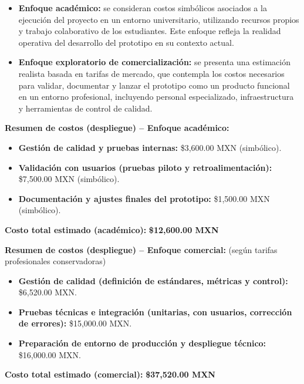 \begin{itemize}
	\item \textbf{Enfoque académico:} se consideran costos simbólicos asociados a la ejecución del proyecto en un entorno universitario, utilizando recursos propios y trabajo colaborativo de los estudiantes. Este enfoque refleja la realidad operativa del desarrollo del prototipo en su contexto actual.
	
	\item \textbf{Enfoque exploratorio de comercialización:} se presenta una estimación realista basada en tarifas de mercado, que contempla los costos necesarios para validar, documentar y lanzar el prototipo como un producto funcional en un entorno profesional, incluyendo personal especializado, infraestructura y herramientas de control de calidad.
\end{itemize}

\vspace{1em}
\noindent\textbf{Resumen de costos (despliegue) – Enfoque académico:}
\begin{itemize}
	\item \textbf{Gestión de calidad y pruebas internas:} \$3,600.00 MXN (simbólico).
	\item \textbf{Validación con usuarios (pruebas piloto y retroalimentación):} \$7,500.00 MXN (simbólico).
	\item \textbf{Documentación y ajustes finales del prototipo:} \$1,500.00 MXN (simbólico).
\end{itemize}

\noindent\textbf{Costo total estimado (académico):} \textbf{\$12,600.00 MXN}

\vspace{1em}
\noindent\textbf{Resumen de costos (despliegue) – Enfoque comercial:} (según tarifas profesionales conservadoras)

\begin{itemize}
	\item \textbf{Gestión de calidad (definición de estándares, métricas y control):} \$6,520.00 MXN.
	\item \textbf{Pruebas técnicas e integración (unitarias, con usuarios, corrección de errores):} \$15,000.00 MXN.
	\item \textbf{Preparación de entorno de producción y despliegue técnico:} \$16,000.00 MXN.
\end{itemize}

\noindent\textbf{Costo total estimado (comercial):} \textbf{\$37,520.00 MXN}

